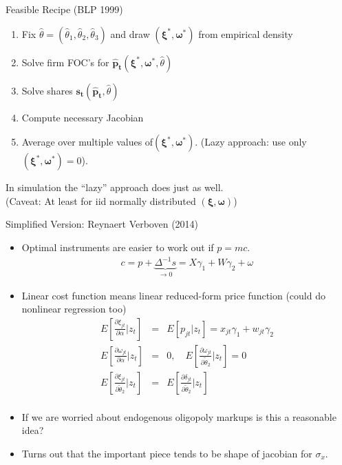 \begin{frame}{Feasible Recipe (BLP 1999)}
\begin{enumerate}
\item Fix $\widehat{\theta}=(\widehat{\theta}_1,\widehat{\theta}_2,\widehat{\theta}_3)$ and draw $(\symbf{\xi}^{*},\symbf{\omega}^{*})$ from empirical density
\item Solve firm FOC's for $\symbf{\hat{p}_{t}}(\symbf{\xi}^{*},\symbf{\omega}^{*},\widehat{\theta})$
\item Solve shares $\symbf{s_{t}}(\symbf{\hat{p}_{t}},\widehat{\theta})$
\item Compute necessary Jacobian
\item Average over multiple values of$(\symbf{\xi}^{*},\symbf{\omega}^{*})$. (Lazy approach: use only $(\symbf{\xi}^{*},\symbf{\omega}^{*})=0$).
\end{enumerate}
In simulation the ``lazy'' approach does just as well.\\
 (Caveat: At least for iid normally distributed $(\symbf{\xi},\symbf{\omega})$)
\end{frame}



\begin{frame}{Simplified Version: Reynaert Verboven (2014)}
\begin{itemize}
\footnotesize
\item Optimal instruments are easier to work out if $p = mc$.
\begin{eqnarray*}
c = p  + \underbrace{\Delta^{-1} s}_{\rightarrow 0}  = X \gamma_1 + W \gamma_2 + \omega
\end{eqnarray*}
\item Linear cost function means linear reduced-form price function (could do nonlinear regression too)
\begin{eqnarray*}
E\left[ \frac{\partial \xi_{jt} }{\partial \alpha} | z_t \right] &=& E[p_{jt} | z_t] = x_{jt} \gamma_1 + w_{jt} \gamma_2\\
E\left[ \frac{\partial \omega_{jt} }{\partial \alpha} | z_t \right] &=& 0 , \quad E\left[ \frac{\partial \omega_{jt} }{\partial \widetilde{\theta}_2} | z_t \right] = 0\\
E\left[ \frac{\partial \xi_{jt} }{\partial \widetilde{\theta}_2} | z_t \right] &=&E\left[ \frac{\partial \delta_{jt} }{\partial \widetilde{\theta}_2} | z_t \right]\\
\end{eqnarray*}
\item If we are worried about endogenous oligopoly markups is this a reasonable idea?
\item Turns out that the important piece tends to be \alert{shape} of jacobian for $\sigma_x$.
\end{itemize}
\end{frame}

